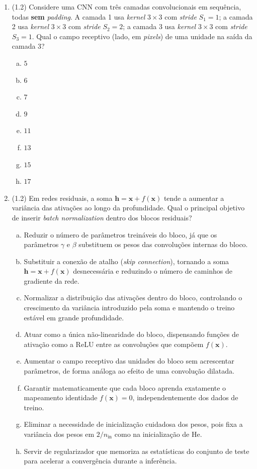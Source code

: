\documentclass[11pt,a4paper]{article}
\begin{document}
\begin{enumerate}[1)]

\item (1.2) Considere uma CNN com três camadas convolucionais em sequência, todas \textbf{sem} \textit{padding}. A camada 1 usa \textit{kernel} $3\times 3$ com \textit{stride} $S_1 = 1$; a camada 2 usa \textit{kernel} $3\times 3$ com \textit{stride} $S_2 = 2$; a camada 3 usa \textit{kernel} $3\times 3$ com \textit{stride} $S_3 = 1$. Qual o campo receptivo (lado, em \textit{pixels}) de uma unidade na saída da camada 3?
\begin{enumerate}[a)]
    \item $5$
    \item $6$
    \item $7$
    \item $9$
    \item $11$
    \item $13$
    \item $15$
    \item $17$
\end{enumerate}

\item (1.2) Em redes residuais, a soma $\mathbf{h} = \mathbf{x} + f(\mathbf{x})$ tende a aumentar a variância das ativações ao longo da profundidade. Qual o principal objetivo de inserir \textit{batch normalization} dentro dos blocos residuais?
\begin{enumerate}[a)]
    \item Reduzir o número de parâmetros treináveis do bloco, já que os parâmetros $\gamma$ e $\beta$ substituem os pesos das convoluções internas do bloco.
    \item Substituir a conexão de atalho (\textit{skip connection}), tornando a soma $\mathbf{h} = \mathbf{x} + f(\mathbf{x})$ desnecessária e reduzindo o número de caminhos de gradiente da rede.
    \item Normalizar a distribuição das ativações dentro do bloco, controlando o crescimento da variância introduzido pela soma e mantendo o treino estável em grande profundidade.
    \item Atuar como a única não-linearidade do bloco, dispensando funções de ativação como a ReLU entre as convoluções que compõem $f(\mathbf{x})$.
    \item Aumentar o campo receptivo das unidades do bloco sem acrescentar parâmetros, de forma análoga ao efeito de uma convolução dilatada.
    \item Garantir matematicamente que cada bloco aprenda exatamente o mapeamento identidade $f(\mathbf{x}) = 0$, independentemente dos dados de treino.
    \item Eliminar a necessidade de inicialização cuidadosa dos pesos, pois fixa a variância dos pesos em $2/n_{\text{in}}$ como na inicialização de He.
    \item Servir de regularizador que memoriza as estatísticas do conjunto de teste para acelerar a convergência durante a inferência.
\end{enumerate}


\end{enumerate}
\end{document}
